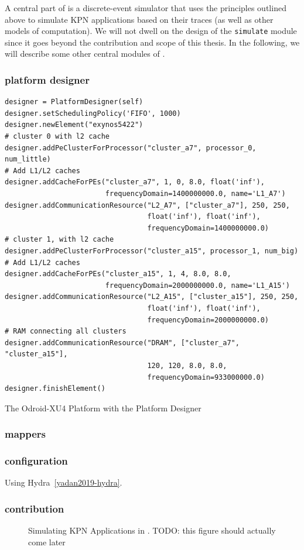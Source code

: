 A central part of \mocasin is a discrete-event simulator that uses the principles outlined above to simulate KPN applications based on their traces (as well as other models of computation).
We will not dwell on the design of the \texttt{simulate} module since it goes beyond the contribution and scope of this thesis.
In the following, we will describe some other central modules of \mocasin. 


\subsubsection{platform designer}

\begin{listing}
\begin{verbatim}
designer = PlatformDesigner(self)
designer.setSchedulingPolicy('FIFO', 1000)
designer.newElement("exynos5422")
# cluster 0 with l2 cache
designer.addPeClusterForProcessor("cluster_a7", processor_0, num_little)
# Add L1/L2 caches
designer.addCacheForPEs("cluster_a7", 1, 0, 8.0, float('inf'),
                        frequencyDomain=1400000000.0, name='L1_A7')
designer.addCommunicationResource("L2_A7", ["cluster_a7"], 250, 250,
                                  float('inf'), float('inf'),
                                  frequencyDomain=1400000000.0)
# cluster 1, with l2 cache
designer.addPeClusterForProcessor("cluster_a15", processor_1, num_big)
# Add L1/L2 caches
designer.addCacheForPEs("cluster_a15", 1, 4, 8.0, 8.0,
                        frequencyDomain=2000000000.0, name='L1_A15')
designer.addCommunicationResource("L2_A15", ["cluster_a15"], 250, 250,
                                  float('inf'), float('inf'),
                                  frequencyDomain=2000000000.0)
# RAM connecting all clusters
designer.addCommunicationResource("DRAM", ["cluster_a7", "cluster_a15"],
                                  120, 120, 8.0, 8.0,
                                  frequencyDomain=933000000.0)
designer.finishElement()
\end{verbatim}
\caption{The Odroid-XU4 Platform with the Platform Designer}
\label{listing:designer_odroid}
\end{listing}

\subsubsection{mappers}

\subsubsection{configuration}

Using Hydra~\ref{yadan2019-hydra}.

\subsubsection{contribution}


\begin{figure}[h]
	\centering
   \resizebox{0.95\textwidth}{!}{}
	\caption{Simulating KPN Applications in \mocasin. TODO: this figure should actually come later}
	\label{fig:mocasin_kpn_simulation}
\end{figure}